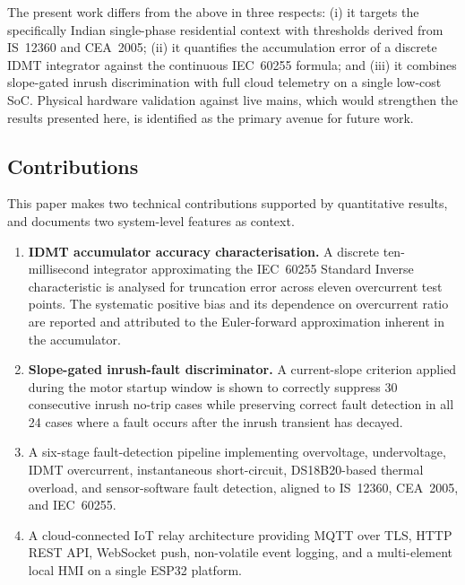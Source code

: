 \documentclass[conference]{IEEEtran}
\begin{document}
The present work differs from the above in three respects: (i) it
targets the specifically Indian single-phase residential context with
thresholds derived from IS~12360 and CEA~2005; (ii) it quantifies the
accumulation error of a discrete IDMT integrator against the continuous
IEC~60255 formula; and (iii) it combines slope-gated inrush
discrimination with full cloud telemetry on a single low-cost SoC.
Physical hardware validation against live mains, which would
strengthen the results presented here, is identified as the primary
avenue for future work.

\subsection{Contributions}

This paper makes two technical contributions supported by quantitative
results, and documents two system-level features as context.

\begin{enumerate}
  \item \textbf{IDMT accumulator accuracy characterisation.}  A discrete
        ten-millisecond integrator approximating the IEC~60255 Standard
        Inverse characteristic is analysed for truncation error across
        eleven overcurrent test points.  The systematic positive bias and
        its dependence on overcurrent ratio are reported and attributed to
        the Euler-forward approximation inherent in the accumulator.

  \item \textbf{Slope-gated inrush-fault discriminator.}  A current-slope
        criterion applied during the motor startup window is shown to
        correctly suppress 30 consecutive inrush no-trip cases while
        preserving correct fault detection in all 24 cases where a fault
        occurs after the inrush transient has decayed.

  \item A six-stage fault-detection pipeline implementing overvoltage,
        undervoltage, IDMT overcurrent, instantaneous short-circuit,
        DS18B20-based thermal overload, and sensor-software fault
        detection, aligned to IS~12360, CEA~2005, and IEC~60255.

  \item A cloud-connected IoT relay architecture providing MQTT over
        TLS, HTTP REST API, WebSocket push, non-volatile event logging,
        and a multi-element local HMI on a single ESP32 platform.
\end{enumerate}
\end{document}
